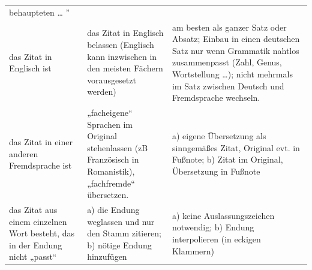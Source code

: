 \documentclass[]{book}
\theoremstyle{definition}
\theoremstyle{definition}
\theoremstyle{definition}
\theoremstyle{remark}
\begin{document}
\begin{longtable}[]{@{}lll@{}}
\begin{minipage}[t]{0.38\columnwidth}
behaupteten \ldots{} '' \vspace{-6mm}\strut
\end{minipage}\tabularnewline
\begin{minipage}[t]{0.13\columnwidth}\raggedright\strut
das Zitat in Englisch ist\strut
\end{minipage} & \begin{minipage}[t]{0.41\columnwidth}\raggedright\strut
das Zitat in Englisch belassen (Englisch kann inzwischen in den meisten
Fächern vorausgesetzt werden)\strut
\end{minipage} & \begin{minipage}[t]{0.38\columnwidth}\raggedright\strut
am besten als ganzer Satz oder Absatz; Einbau in einen deutschen Satz
nur wenn Grammatik nahtlos zusammenpasst (Zahl, Genus, Wortstellung
\ldots{}); nicht mehrmals im Satz zwischen Deutsch und Fremdsprache
wechseln. \vspace{-6mm}\strut
\end{minipage}\tabularnewline
\begin{minipage}[t]{0.13\columnwidth}\raggedright\strut
das Zitat in einer anderen Fremdsprache ist\strut
\end{minipage} & \begin{minipage}[t]{0.41\columnwidth}\raggedright\strut
„facheigene`` Sprachen im Original stehenlassen (zB Französisch in
Romanistik), „fachfremde`` übersetzen.\strut
\end{minipage} & \begin{minipage}[t]{0.38\columnwidth}\raggedright\strut
a) eigene Übersetzung als sinngemäßes Zitat, Original evt. in Fußnote;
b) Zitat im Original, Übersetzung in Fußnote \vspace{-6mm}\strut
\end{minipage}\tabularnewline
\begin{minipage}[t]{0.13\columnwidth}\raggedright\strut
das Zitat aus einem einzelnen Wort besteht, das in der Endung nicht
„passt``\strut
\end{minipage} & \begin{minipage}[t]{0.41\columnwidth}\raggedright\strut
a) die Endung weglassen und nur den Stamm zitieren; b) nötige Endung
hinzufügen\strut
\end{minipage} & \begin{minipage}[t]{0.38\columnwidth}\raggedright\strut
a) keine Auslassungszeichen notwendig; b) Endung interpolieren (in
eckigen Klammern) \vspace{-6mm}\strut
\end{minipage}\tabularnewline

\end{longtable}
\end{document}
